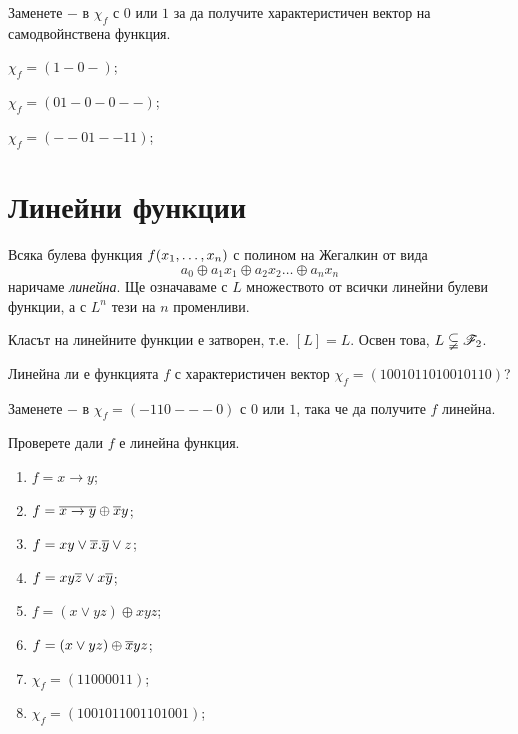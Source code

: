 \begin{problem}
  Заменете $-$ в $\chi_f$ с $0$ или $1$ за да получите характеристичен вектор на самодвойнствена функция.\\
  \begin{inparaenum}[a)]
  \item
    $\chi_f = (1-0-)$;
  \item
    $\chi_f = (01-0-0--)$;
  \item
    $\chi_f = (--01--11)$;
  \end{inparaenum}
\end{problem}

\section{Линейни функции}
Всяка булева функция $f(x_{1},\dots,x_{n})$ с полином на Жегалкин от вида 
\[a_0\oplus a_1x_1 \oplus a_2x_2 \dots\oplus a_nx_n\] наричаме {\em линейна}.
Ще означаваме с $L$ множеството от всички линейни булеви функции, а с $L^n$ тези на $n$ променливи.

\begin{prop}
  Класът на линейните функции е затворен, т.е. $[L] = L$.
  Освен това, $L \subsetneqq \mathscr{F}_2$.
\end{prop}


\begin{problem}
  Линейна ли е функцията $f$ с характеристичен вектор $\chi_f = (1001011010010110)$?
\end{problem}

\begin{problem}
  Заменете $-$ в $\chi_f = (-110---0)$ с $0$ или $1$, така че да получите $f$ линейна.
\end{problem}


\begin{problem}
  Проверете дали $f$ е линейна функция.
  \begin{enumerate}
  \item
    $f = x\rightarrow y$;
  \item
    $f = \overline{x\rightarrow y}\oplus \overline{x}y$;
  \item
    $f = xy\vee \overline{x}.\overline{y}\vee z$;
  \item
    $f = xy\overline{z}\vee x\overline{y}$;
  \item
    $f = (x\vee yz)\oplus xyz$;
  \item
    $f = (x\vee yz)\oplus \overline{x}yz$;
  \item
    $\chi_f = (1100 0011)$;
  \item
    $\chi_f = (1001 0110 0110 1001)$;
  \end{enumerate}
\end{problem}

